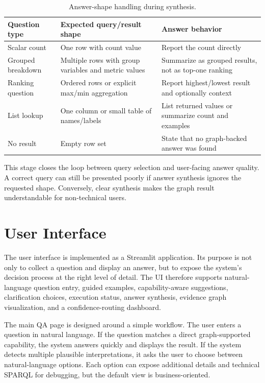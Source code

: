 \begin{table}[ht]
\centering
\caption{Answer-shape handling during synthesis.}
\label{tab:answer-shape-synthesis}
\begin{tabular}{p{3.4cm}p{5.6cm}p{4.6cm}}
\hline
\textbf{Question type} & \textbf{Expected query/result shape} & \textbf{Answer behavior} \\
\hline
Scalar count & One row with count value & Report the count directly \\
Grouped breakdown & Multiple rows with group variables and metric values & Summarize as grouped results, not as top-one ranking \\
Ranking question & Ordered rows or explicit max/min aggregation & Report highest/lowest result and optionally context \\
List lookup & One column or small table of names/labels & List returned values or summarize count and examples \\
No result & Empty row set & State that no graph-backed answer was found \\
\hline
\end{tabular}
\end{table}

This stage closes the loop between query selection and user-facing answer quality. A correct query can still be presented poorly if answer synthesis ignores the requested shape. Conversely, clear synthesis makes the graph result understandable for non-technical users.

\section{User Interface}
\label{sec:user-interface}

The user interface is implemented as a Streamlit application. Its purpose is not only to collect a question and display an answer, but to expose the system's decision process at the right level of detail. The UI therefore supports natural-language question entry, guided examples, capability-aware suggestions, clarification choices, execution status, answer synthesis, evidence graph visualization, and a confidence-routing dashboard.

The main QA page is designed around a simple workflow. The user enters a question in natural language. If the question matches a direct graph-supported capability, the system answers quickly and displays the result. If the system detects multiple plausible interpretations, it asks the user to choose between natural-language options. Each option can expose additional details and technical SPARQL for debugging, but the default view is business-oriented.

